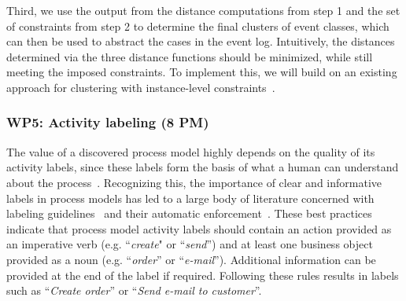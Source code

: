 
 Third, we use the output from the distance computations from step 1 and the set of constraints from step 2 to determine the final 
clusters of event classes, which can then be used to abstract the cases in the event log. Intuitively, the distances determined via the three distance functions should be minimized, while still meeting the imposed constraints. To implement this, we will build on an existing approach for clustering with instance-level constraints~\cite{wagstaff2000clustering}. 





\subsubsection{WP5: Activity labeling (8 PM)}
\label{sec:wp5}

The value of a discovered process model highly depends on the quality of its activity labels, since these labels form the basis of what a human can understand about the process~\cite{mendling2010activity}. Recognizing this,  the importance of clear and informative labels in process models has led to a large body of literature concerned with labeling guidelines~\cite{mendling2010seven,leopold2015learning} and their automatic enforcement~\cite{leopold2013detection,becker2009towards}. 
These best practices indicate that process model activity labels should contain an action provided as an imperative verb (e.g. ``\textit{create}" or ``\textit{send}'') and at least one business object provided as a noun (e.g. ``\textit{order}'' or ``\textit{e-mail}''). Additional information can be provided at the end of the label if required. Following these rules results in labels such as ``\textit{Create order}'' or ``\textit{Send e-mail to customer}''. 

